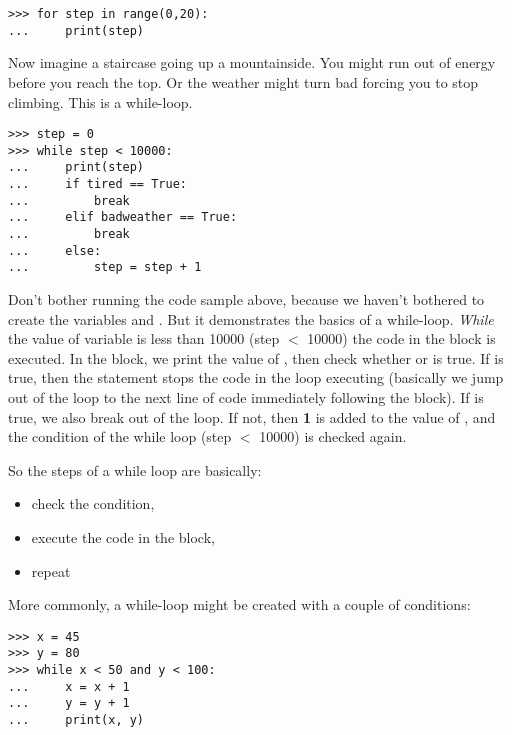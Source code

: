 \begin{listing}
\begin{verbatim}
>>> for step in range(0,20):
...     print(step)
\end{verbatim}
\end{listing}

Now imagine a staircase going up a mountainside.  You might run out of energy before you reach the top.  Or the weather might turn bad forcing you to stop climbing.  This is a while-loop.

\begin{listing}
\begin{verbatim}
>>> step = 0
>>> while step < 10000:
...     print(step)
...     if tired == True:
...         break
...     elif badweather == True:
...         break
...     else:
...         step = step + 1
\end{verbatim}
\end{listing}

Don't bother running the code sample above, because we haven't bothered to create the variables  and .  But it demonstrates the basics of a while-loop.  \emph{While} the value of variable  is less than 10000 (step $<$ 10000) the code in the block is executed.  In the block, we print the value of , then check whether  or  is true.  If  is true, then the  statement stops the code in the loop executing (basically we jump out of the loop to the next line of code immediately following the block).  If  is true, we also break out of the loop.  If not, then \textbf{1} is added to the value of , and the condition of the while loop (step $<$ 10000) is checked again.
\par
\noindent
So the steps of a while loop are basically:

{\renewcommand{\labelitemi}{$\triangleright$}
\begin{itemize}
\item check the condition,
\item execute the code in the block,
\item repeat
\end{itemize}}

More commonly, a while-loop might be created with a couple of conditions:

\begin{listing}
\begin{verbatim}
>>> x = 45
>>> y = 80
>>> while x < 50 and y < 100:
...     x = x + 1
...     y = y + 1
...     print(x, y)
\end{verbatim}
\end{listing}

